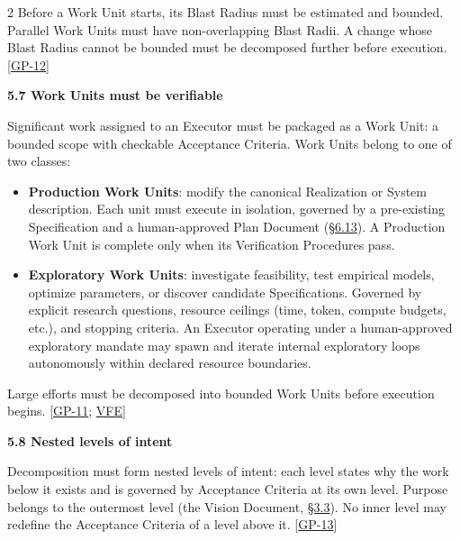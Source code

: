\begin{multicols}{2}
Before a Work Unit starts, its Blast Radius must be estimated and bounded. Parallel Work Units must have non-overlapping Blast Radii. A change whose Blast Radius cannot be bounded must be decomposed further before execution. [\hyperlink{gp-12}{GP-12}]

\hypertarget{nss-5.7}{}

\par\smallskip\noindent\textbf{5.7 Work Units must be verifiable}\par\nopagebreak

Significant work assigned to an Executor must be packaged as a Work Unit: a bounded scope with checkable Acceptance Criteria. Work Units belong to one of two classes:

\begin{itemize}\setlength{\itemsep}{0pt}\setlength{\parskip}{0pt}

\item \textbf{Production Work Units}: modify the canonical Realization or System description. Each unit must execute in isolation, governed by a pre-existing Specification and a human-approved Plan Document (\hyperlink{nss-6.13}{\S6.13}). A Production Work Unit is complete only when its Verification Procedures pass.

\item \textbf{Exploratory Work Units}: investigate feasibility, test empirical models, optimize parameters, or discover candidate Specifications. Governed by explicit research questions, resource ceilings (time, token, compute budgets, etc.), and stopping criteria. An Executor operating under a human-approved exploratory mandate may spawn and iterate internal exploratory loops autonomously within declared resource boundaries.

\end{itemize}

Large efforts must be decomposed into bounded Work Units before execution begins. [\hyperlink{gp-11}{GP-11}; \hyperlink{gp-VFE}{VFE}]

\hypertarget{nss-5.8}{}

\par\smallskip\noindent\textbf{5.8 Nested levels of intent}\par\nopagebreak

Decomposition must form nested levels of intent: each level states why the work below it exists and is governed by Acceptance Criteria at its own level. Purpose belongs to the outermost level (the Vision Document, \hyperlink{nss-3.3}{\S3.3}). No inner level may redefine the Acceptance Criteria of a level above it. [\hyperlink{gp-13}{GP-13}]


\end{multicols}

